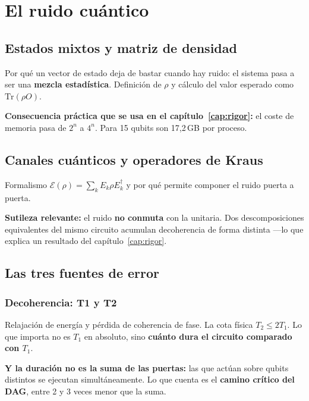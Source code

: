\chapter{El ruido cuántico}
\label{cap:ruido}


\section{Estados mixtos y matriz de densidad}
\label{sec:densidad}
Por qué un vector de estado deja de bastar cuando hay ruido: el sistema pasa a ser una
\textbf{mezcla estadística}. Definición de $\rho$ y cálculo del valor esperado como
$\mathrm{Tr}(\rho O)$.

\textbf{Consecuencia práctica que se usa en el capítulo~\ref{cap:rigor}:} el coste de memoria
pasa de $2^n$ a $4^n$. Para 15 qubits son 17,2\,GB por proceso.

\section{Canales cuánticos y operadores de Kraus}
\label{sec:kraus}
Formalismo $\mathcal{E}(\rho) = \sum_k E_k \rho E_k^\dagger$ y por qué permite componer el
ruido puerta a puerta.

\textbf{Sutileza relevante:} el ruido \textbf{no conmuta} con la unitaria. Dos descomposiciones
equivalentes del mismo circuito acumulan decoherencia de forma distinta —lo que explica un
resultado del capítulo~\ref{cap:rigor}.

\section{Las tres fuentes de error}
\label{sec:fuentes}

\subsection{Decoherencia: T1 y T2}
Relajación de energía y pérdida de coherencia de fase. La cota física $T_2 \leq 2T_1$.
Lo que importa no es $T_1$ en absoluto, sino \textbf{cuánto dura el circuito comparado con
$T_1$}.

\textbf{Y la duración no es la suma de las puertas:} las que actúan sobre qubits distintos se
ejecutan simultáneamente. Lo que cuenta es el \textbf{camino crítico del DAG}, entre 2 y 3
veces menor que la suma.

